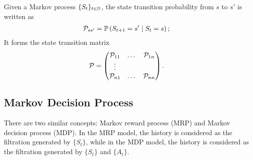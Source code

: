 Given a Markov process $\{S_t\}_{t\in \mathbb{N}}$, the state transition probability from $s$ to $s'$ is written as
\begin{align*}
\mathcal{P}_{ss'} = \mathbb{P}\left( S_{t+1} = s' \mid S_t = s \right);
\end{align*}
It forms the state transition matrix
\begin{align*}
\mathcal{P} = \begin{pmatrix}
\mathcal{P}_{11} & \dots & \mathcal{P}_{1n} \\
\vdots & & \\
\mathcal{P}_{n1} & \dots & \mathcal{P}_{nn}
\end{pmatrix}.
\end{align*} 

\subsection*{Markov Decision Process} 
There are two similar concepts: Markov reward process (MRP) and Markov decision process (MDP). In the MRP model, the history is considered as the filtration generated by $\{S_t\}$, while in the MDP model, the history is considered as the filtration generated by $\{S_t\}$ and $\{A_t\}$.  
